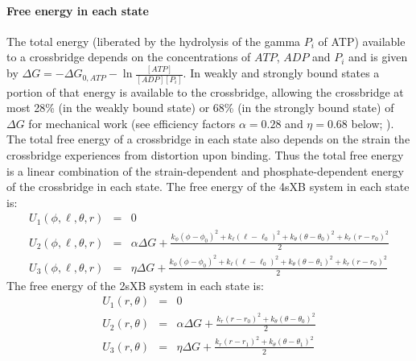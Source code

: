 \documentclass[]{article}
\begin{document}
\paragraph{Free energy in each state} %
The total energy (liberated by the hydrolysis of the gamma $P_i$ of ATP) available to a crossbridge depends on the concentrations of $ATP$, $ADP$ and $P_i$ and is given by $\Delta G = -\Delta G_{0,ATP} - \ln \frac{[ATP]}{[ADP] [P_i]}$. 
In weakly and strongly bound states a portion of that energy is available to the crossbridge, allowing the crossbridge at most 28\% (in the weakly bound state) or 68\% (in the strongly bound state) of $\Delta G$ for mechanical work (see efficiency factors $\alpha=0.28$ and $\eta=0.68$ below; \citet{Pate1989, Tanner:2007:pe115}).
The total free energy of a crossbridge in each state also depends on the strain the crossbridge experiences from distortion upon binding.
Thus the total free energy is a linear combination of the strain-dependent and phosphate-dependent energy of the crossbridge in each state.
The free energy of the 4sXB system in each state is: 
\begin{eqnarray}
\label{4sEnergy}
U_1(\phi,\ell,\theta,r) & = & 0 \nonumber \\
U_2(\phi,\ell,\theta,r) & = & \alpha \Delta G + \frac{k_\phi (\phi-\phi_0)^2 + k_\ell (\ell-\ell_0)^2 + k_\theta (\theta-\theta_0)^2 + k_r (r-r_0)^2}{2} \nonumber \\
U_3(\phi,\ell,\theta,r) & = & \eta \Delta G + \frac{k_\phi (\phi-\phi_0)^2 + k_\ell (\ell-\ell_0)^2 + k_\theta (\theta-\theta_1)^2 + k_r (r-r_0)^2}{2} \nonumber
\end{eqnarray}
The free energy of the 2sXB system in each state is: 
\begin{eqnarray}
\label{2sEnergy}
	U_1(r,\theta) & = & 0 \nonumber \\
    U_2(r,\theta) & = & \alpha \Delta G + \frac{k_r (r - r_0)^2 + 
                        k_\theta (\theta - \theta_0)^2}{2} \nonumber \\
    U_3(r,\theta) & = & \eta \Delta G   + \frac{k_r (r - r_1)^2 + 
                        k_\theta (\theta - \theta_1)^2}{2} \nonumber
\end{eqnarray}
\end{document}
